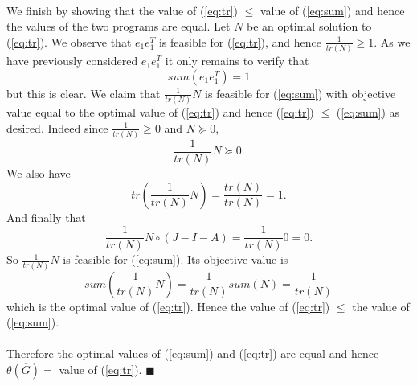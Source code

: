 \documentclass[letterpaper,12pt,oneside,onecolumn]{article}
\newcommand{\1}{\mathbbm{1}}
\begin{document}
\paragraph{}
We finish by showing that the value of (\ref{eq:tr}) $\leq$ value of (\ref{eq:sum}) and hence the values of the two programs are equal. Let $N$ be an optimal solution to (\ref{eq:tr}). We observe that $e_1e_1^T$ is feasible for (\ref{eq:tr}), and hence $\frac{1}{tr(N)} \geq 1$. As we have previously considered $e_1e_1^T$ it only remains to verify that
$$sum(e_1e_1^T) = 1$$
but this is clear. We claim that $\frac{1}{tr(N)} N$ is feasible for (\ref{eq:sum}) with objective value equal to the optimal value of (\ref{eq:tr}) and hence (\ref{eq:tr}) $\leq$ (\ref{eq:sum}) as desired. Indeed since $\frac{1}{tr(N)} \geq 0$ and $N\succcurlyeq 0$,
$$\frac{1}{tr(N)} N \succcurlyeq 0.$$
We also have $$tr(\frac{1}{tr(N)}N) = \frac{tr(N)}{tr(N)} = 1.$$
And finally that
$$\frac{1}{tr(N)} N \circ(J - I - A) = \frac{1}{tr(N)} 0 = 0.$$
So $\frac{1}{tr(N)}N$ is feasible for (\ref{eq:sum}). Its objective value is
$$sum(\frac{1}{tr(N)}N) = \frac{1}{tr(N)} sum(N) = \frac{1}{tr(N)}$$
which is the optimal value of (\ref{eq:tr}). Hence the value of (\ref{eq:tr}) $\leq$ the value of (\ref{eq:sum}).
\paragraph{}
Therefore the optimal values of (\ref{eq:sum}) and (\ref{eq:tr}) are equal and hence $\theta(\overline{G}) =$ value of (\ref{eq:tr}). $\blacksquare$
\end{document}
